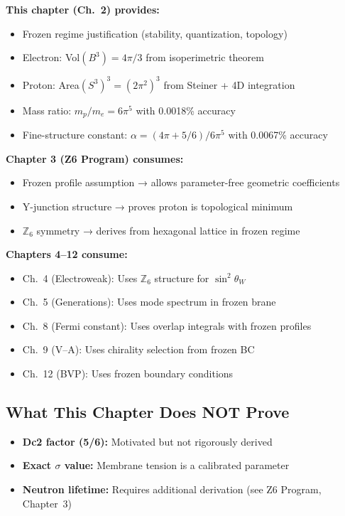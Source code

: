 \begin{tcolorbox}[colback=yellow!5!white, colframe=yellow!50!black,
    title=\textbf{Dependency Chain}]
\textbf{This chapter (Ch.~2) provides:}
\begin{itemize}[nosep]
    \item Frozen regime justification (stability, quantization, topology)
    \item Electron: Vol$(B^3) = 4\pi/3$ from isoperimetric theorem
    \item Proton: Area$(S^3)^3 = (2\pi^2)^3$ from Steiner + 4D integration
    \item Mass ratio: $m_p/m_e = 6\pi^5$ with 0.0018\% accuracy
    \item Fine-structure constant: $\alpha = (4\pi + 5/6)/6\pi^5$ with 0.0067\% accuracy
\end{itemize}

\textbf{Chapter 3 (Z6 Program) consumes:}
\begin{itemize}[nosep]
    \item Frozen profile assumption → allows parameter-free geometric coefficients
    \item Y-junction structure → proves proton is topological minimum
    \item $\mathbb{Z}_6$ symmetry → derives from hexagonal lattice in frozen regime
\end{itemize}

\textbf{Chapters 4--12 consume:}
\begin{itemize}[nosep]
    \item Ch.~4 (Electroweak): Uses $\mathbb{Z}_6$ structure for $\sin^2\theta_W$
    \item Ch.~5 (Generations): Uses mode spectrum in frozen brane
    \item Ch.~8 (Fermi constant): Uses overlap integrals with frozen profiles
    \item Ch.~9 (V--A): Uses chirality selection from frozen BC
    \item Ch.~12 (BVP): Uses frozen boundary conditions
\end{itemize}
\end{tcolorbox}

\subsection{What This Chapter Does NOT Prove}

\begin{itemize}
    \item \textbf{Dc2 factor (5/6):} Motivated but not rigorously derived \tagP{}
    \item \textbf{Exact $\sigma$ value:} Membrane tension is a calibrated parameter \tagCal{}
    \item \textbf{Neutron lifetime:} Requires additional derivation (see Z6 Program, Chapter~3)
\end{itemize}

